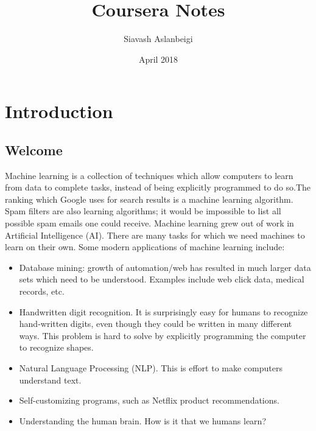 \documentclass{article}
\title{Coursera Notes}
\author{Siavash Aslanbeigi}
\date{April 2018}
\theoremstyle{definition}
\begin{document}
\maketitle
\tableofcontents

\section{Introduction}

\subsection{Welcome}
Machine learning is a collection of techniques which allow computers to learn from data to complete tasks, instead of being explicitly programmed to do so.The ranking which Google uses for search results is a machine learning algorithm. Spam filters are also learning algorithms; it would be impossible to list all possible spam emails one could receive. Machine learning grew out of work in Artificial Intelligence (AI). There are many tasks for which we need machines to learn on their own. Some modern applications of machine learning include:
\begin{itemize}
    \item Database mining: growth of automation/web has resulted in much larger data sets which need to be understood. Examples include web click data, medical records, etc.
    \item Handwritten digit recognition. It is surprisingly easy for humans to recognize hand-written digits, even though they could be written in many different ways. This problem is hard to solve by explicitly programming the computer to recognize shapes.
    \item Natural Language Processing (NLP). This is effort to make computers understand text.
    \item Self-customizing programs, such as Netflix product recommendations.
    \item Understanding the human brain. How is it that we humans learn?
\end{itemize}

\end{document}
